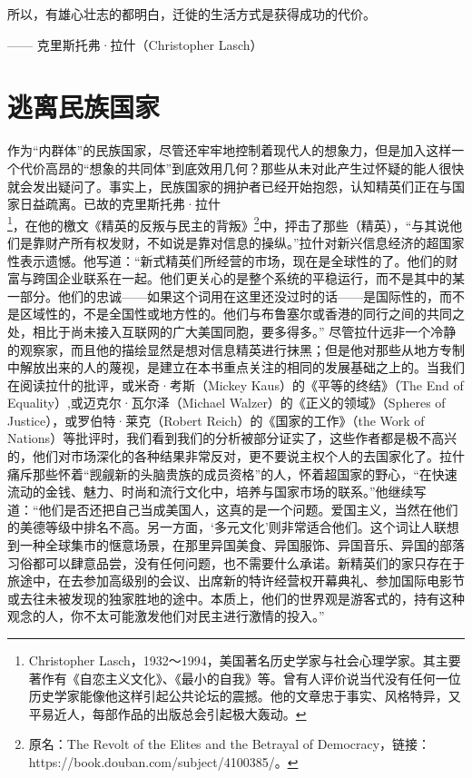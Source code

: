 \begin{tcolorbox}
\kaishu 所以，有雄心壮志的都明白，迁徙的生活方式是获得成功的代价。
\begin{flushright}
—— 克里斯托弗·拉什（Christopher Lasch）
\end{flushright}
\end{tcolorbox}


\section{逃离民族国家}
作为“内群体”的民族国家，尽管还牢牢地控制着现代人的想象力，但是加入这样一个代价高昂的“想象的共同体”到底效用几何？那些从未对此产生过怀疑的能人很快就会发出疑问了。事实上，民族国家的拥护者已经开始抱怨，认知精英们正在与国家日益疏离。已故的克里斯托弗·拉什\footnote{Christopher Lasch，1932～1994，美国著名历史学家与社会心理学家。其主要著作有《自恋主义文化》、《最小的自我》等。曾有人评价说当代没有任何一位历史学家能像他这样引起公共论坛的震撼。他的文章忠于事实、风格特异，又平易近人，每部作品的出版总会引起极大轰动。}，在他的檄文《精英的反叛与民主的背叛》\footnote{原名：The Revolt of the Elites and the Betrayal of Democracy，链接：https://book.douban.com/subject/4100385/。}中，抨击了那些（精英），“与其说他们是靠财产所有权发财，不如说是靠对信息的操纵。”拉什对新兴信息经济的超国家性表示遗憾。他写道：“新式精英们所经营的市场，现在是全球性的了。他们的财富与跨国企业联系在一起。他们更关心的是整个系统的平稳运行，而不是其中的某一部分。他们的忠诚——如果这个词用在这里还没过时的话——是国际性的，而不是区域性的，不是全国性或地方性的。他们与布鲁塞尔或香港的同行之间的共同之处，相比于尚未接入互联网的广大美国同胞，要多得多。” 尽管拉什远非一个冷静的观察家，而且他的描绘显然是想对信息精英进行抹黑；但是他对那些从地方专制中解放出来的人的蔑视，是建立在本书重点关注的相同的发展基础之上的。当我们在阅读拉什的批评，或米奇·考斯（Mickey Kaus）的《平等的终结》（The End of Equality）,或迈克尔·瓦尔泽（Michael Walzer）的《正义的领域》（Spheres of Justice），或罗伯特·莱克（Robert Reich）的《国家的工作》（the Work of Nations）等批评时，我们看到我们的分析被部分证实了，这些作者都是极不高兴的，他们对市场深化的各种结果非常反对，更不要说主权个人的去国家化了。拉什痛斥那些怀着“觊觎新的头脑贵族的成员资格”的人，怀着超国家的野心，“在快速流动的金钱、魅力、时尚和流行文化中，培养与国家市场的联系。”他继续写道：“他们是否还把自己当成美国人，这真的是一个问题。爱国主义，当然在他们的美德等级中排名不高。另一方面，‘多元文化’则非常适合他们。这个词让人联想到一种全球集市的惬意场景，在那里异国美食、异国服饰、异国音乐、异国的部落习俗都可以肆意品尝，没有任何问题，也不需要什么承诺。新精英们的家只存在于旅途中，在去参加高级别的会议、出席新的特许经营权开幕典礼、参加国际电影节或去往未被发现的独家胜地的途中。本质上，他们的世界观是游客式的，持有这种观念的人，你不太可能激发他们对民主进行激情的投入。” 

